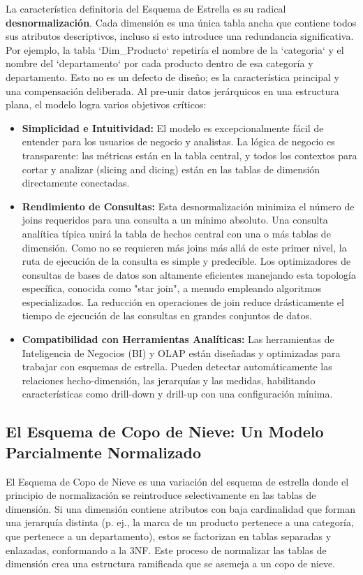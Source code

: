 \documentclass{article}
\begin{document}
La característica definitoria del Esquema de Estrella es su radical \textbf{desnormalización}. Cada dimensión es una única tabla ancha que contiene todos sus atributos descriptivos, incluso si esto introduce una redundancia significativa. Por ejemplo, la tabla `Dim_Producto` repetiría el nombre de la `categoria` y el nombre del `departamento` por cada producto dentro de esa categoría y departamento. Esto no es un defecto de diseño; es la característica principal y una compensación deliberada. Al pre-unir datos jerárquicos en una estructura plana, el modelo logra varios objetivos críticos:
\begin{itemize}
    \item \textbf{Simplicidad e Intuitividad:} El modelo es excepcionalmente fácil de entender para los usuarios de negocio y analistas. La lógica de negocio es transparente: las métricas están en la tabla central, y todos los contextos para cortar y analizar (slicing and dicing) están en las tablas de dimensión directamente conectadas.
    \item \textbf{Rendimiento de Consultas:} Esta desnormalización minimiza el número de joins requeridos para una consulta a un mínimo absoluto. Una consulta analítica típica unirá la tabla de hechos central con una o más tablas de dimensión. Como no se requieren más joins más allá de este primer nivel, la ruta de ejecución de la consulta es simple y predecible. Los optimizadores de consultas de bases de datos son altamente eficientes manejando esta topología específica, conocida como "star join", a menudo empleando algoritmos especializados. La reducción en operaciones de join reduce drásticamente el tiempo de ejecución de las consultas en grandes conjuntos de datos.
    \item \textbf{Compatibilidad con Herramientas Analíticas:} Las herramientas de Inteligencia de Negocios (BI) y OLAP están diseñadas y optimizadas para trabajar con esquemas de estrella. Pueden detectar automáticamente las relaciones hecho-dimensión, las jerarquías y las medidas, habilitando características como drill-down y drill-up con una configuración mínima.
\end{itemize}

\subsection{El Esquema de Copo de Nieve: Un Modelo Parcialmente Normalizado}
El Esquema de Copo de Nieve es una variación del esquema de estrella donde el principio de normalización se reintroduce selectivamente en las tablas de dimensión. Si una dimensión contiene atributos con baja cardinalidad que forman una jerarquía distinta (p. ej., la marca de un producto pertenece a una categoría, que pertenece a un departamento), estos se factorizan en tablas separadas y enlazadas, conformando a la 3NF. Este proceso de normalizar las tablas de dimensión crea una estructura ramificada que se asemeja a un copo de nieve.
\end{document}
